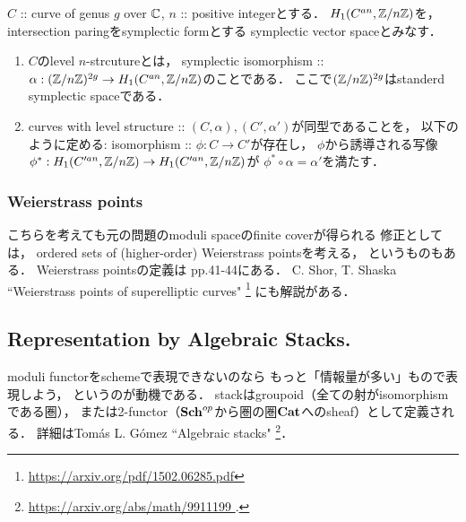 \documentclass[a4paper]{jsarticle}
\begin{document}
    \begin{Def}
        $C$ :: curve of genus $g$ over $\mathbb{C}$, $n$ :: positive integerとする．
        $H_1(C^{an}, \mathbb{Z}/n\mathbb{Z})$を，
        intersection paringをsymplectic formとする
        symplectic vector spaceとみなす．

        \begin{enumerate}[label=(\roman*), leftmargin=*]
        \item 
        $C$のlevel $n$-strcutureとは，
        symplectic isomorphism :: $\alpha: (\mathbb{Z}/n\mathbb{Z})^{2g} \to H_1(C^{an}, \mathbb{Z}/n\mathbb{Z})$のことである．
        ここで$(\mathbb{Z}/n\mathbb{Z})^{2g}$はstanderd symplectic spaceである．

        \item
        curves with level structure :: $(C, \alpha), (C', \alpha')$が同型であることを，
        以下のように定める:
        isomorphism :: $\phi: C \to C'$が存在し，
        $\phi$から誘導される写像$\phi^*: H_1(C'^{an}, \mathbb{Z}/n\mathbb{Z}) \to H_1(C'^{an}, \mathbb{Z}/n\mathbb{Z})$が
        $\phi^* \circ \alpha=\alpha'$を満たす．
        \end{enumerate}
    \end{Def}


    \subsubsection{ Weierstrass points }
    こちらを考えても元の問題のmoduli spaceのfinite coverが得られる
    修正としては，
    ordered sets of (higher-order) Weierstrass pointsを考える，
    というものもある．
    Weierstrass pointsの定義は\cite{GAC} pp.41-44にある．
    C. Shor, T. Shaska ``Weierstrass points of superelliptic curves"
    \footnote{\url{https://arxiv.org/pdf/1502.06285.pdf}}
    にも解説がある．

    \subsection{Representation by Algebraic Stacks.}
    moduli functorをschemeで表現できないのなら
    もっと「情報量が多い」もので表現しよう，
    というのが動機である．
    stackはgroupoid（全ての射がisomorphismである圏），
    または2-functor（$\mathbf{Sch}^{op}$から圏の圏$\mathbf{Cat}$へのsheaf）として定義される．
    詳細はTom\'as L. G\'omez ``Algebraic stacks"
    \footnote{ \url{ https://arxiv.org/abs/math/9911199 }. }．



\end{document}
